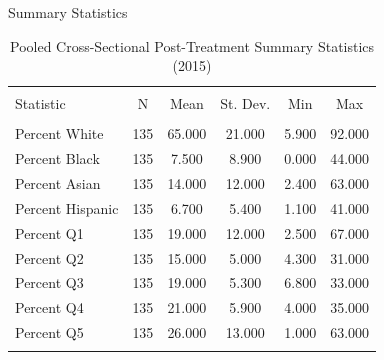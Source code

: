 \documentclass[11pt,ignorenonframetext,]{beamer}
\begin{document}
\begin{frame}{Summary Statistics}
\protect\hypertarget{summary-statistics-1}{}

\begin{table}[!htbp] \centering 
  \caption{Pooled Cross-Sectional Post-Treatment Summary Statistics (2015)} 
  \label{} 
\begin{tabular}{@{\extracolsep{5pt}}lccccc} 
\\[-1.8ex]\hline 
\hline \\[-1.8ex] 
Statistic & \multicolumn{1}{c}{N} & \multicolumn{1}{c}{Mean} & \multicolumn{1}{c}{St. Dev.} & \multicolumn{1}{c}{Min} & \multicolumn{1}{c}{Max} \\ 
\hline \\[-1.8ex] 
Percent White & 135 & 65.000 & 21.000 & 5.900 & 92.000 \\ 
Percent Black & 135 & 7.500 & 8.900 & 0.000 & 44.000 \\ 
Percent Asian & 135 & 14.000 & 12.000 & 2.400 & 63.000 \\ 
Percent Hispanic & 135 & 6.700 & 5.400 & 1.100 & 41.000 \\ 
Percent Q1 & 135 & 19.000 & 12.000 & 2.500 & 67.000 \\ 
Percent Q2 & 135 & 15.000 & 5.000 & 4.300 & 31.000 \\ 
Percent Q3 & 135 & 19.000 & 5.300 & 6.800 & 33.000 \\ 
Percent Q4 & 135 & 21.000 & 5.900 & 4.000 & 35.000 \\ 
Percent Q5 & 135 & 26.000 & 13.000 & 1.000 & 63.000 \\ 
\hline \\[-1.8ex] 
\end{tabular} 
\end{table}

\end{frame}
\end{document}
